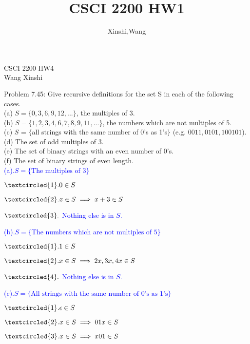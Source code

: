 \documentclass{article}
\title{CSCI 2200 HW1}
\author{Xinshi,Wang}
\begin{document}
\noindent
CSCI 2200 HW4\\
Wang Xinshi\\

\begin{addmargin}[2em]{2em}
	Problem 7.45: Give recursive definitions for the set S in each of the following cases.\\
	(a) $S = \{0, 3, 6, 9, 12, . . .\}$, the multiples of 3.\\
	(b) $S = \{1, 2, 3, 4, 6, 7, 8, 9, 11, . . .\}$, the numbers which are not multiples of 5.\\
	(c) $S$ = $\{$all strings with the same number of 0’s as 1’s$\}$ (e.g. $0011,0101,100101$).\\
	(d) The set of odd multiples of $3$.\\
	(e) The set of binary strings with an even number of $0$’s.\\
	(f) The set of binary strings of even length.
\\
	
	\noindent
	\textcolor{blue}{
	(a).$S = \{\text{The multiples of 3}\}$
	}	
	
	\textcolor{blue}{
		$\textcircled{1}. 0 \in S$ 
	}

	\textcolor{blue}{
		$\textcircled{2}. x \in S \implies x+3 \in S$ 
	}
	
	\textcolor{blue}{
		$\textcircled{3}.$ Nothing else is in $S$.\\
	}
	
	\noindent
	\textcolor{blue}{
	(b).$S = \{\text{The numbers which are not multiples of 5}\}$
	}

	\textcolor{blue}{
	$\textcircled{1}. 1 \in S$
	}
	
	\textcolor{blue}{
	$\textcircled{2}. x \in S \implies 2x,3x,4x  \in S$
	}

	\textcolor{blue}{
	$\textcircled{4}.$ Nothing else is in $S$.\\
	}
	
	\noindent
	\textcolor{blue}{
		(c).$S = \{\text{All strings with the same number of 0's as 1's}\}$
	}
	
	\textcolor{blue}{
		$\textcircled{1}. \epsilon \in S$
	}
	
	\textcolor{blue}{
		$\textcircled{2}. x \in S \implies 01x \in S$
	}
	
	\textcolor{blue}{
		$\textcircled{3}. x \in S \implies x01 \in S$
	}


\end{addmargin}
\end{document}
